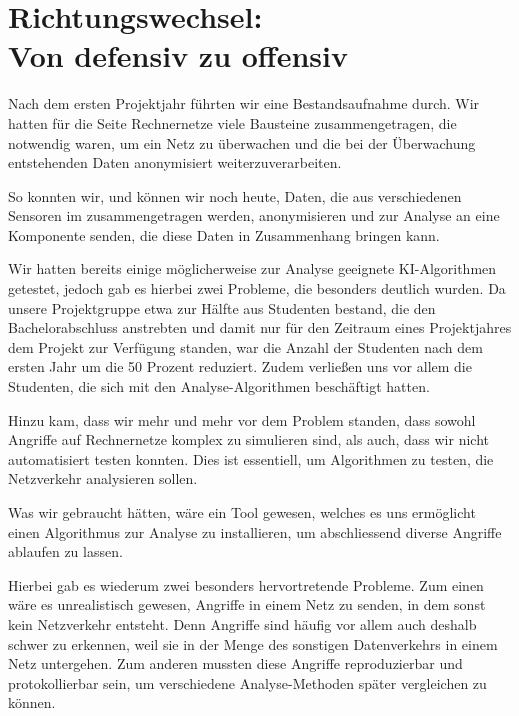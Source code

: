 
\section[Richtungswechsel: Von defensiv zu offensiv]
  {Richtungswechsel:\\Von defensiv zu offensiv}
\label{sec:motivation:change}

\authors{\DE \and \JF}{\LM \and \KUH \and \MW \and \BK}

Nach dem ersten Projektjahr führten wir eine Bestandsaufnahme
durch. Wir hatten für die Seite Rechnernetze viele Bausteine
zusammengetragen, die notwendig waren, um ein Netz zu überwachen und
die bei der Überwachung entstehenden Daten anonymisiert
weiterzuverarbeiten.

So konnten wir, und können wir noch heute, Daten, die aus
verschiedenen Sensoren im  zusammengetragen werden,
anonymisieren und zur Analyse an eine Komponente senden, die diese
Daten in Zusammenhang bringen kann.

Wir hatten bereits einige möglicherweise zur Analyse geeignete
KI-Algorithmen getestet, jedoch gab es hierbei zwei Probleme, die
besonders deutlich wurden. Da unsere Projektgruppe etwa zur Hälfte aus
Studenten bestand, die den Bachelorabschluss anstrebten und damit nur
für den Zeitraum eines Projektjahres dem Projekt zur Verfügung
standen, war die Anzahl der Studenten nach dem ersten Jahr um die 50
Prozent reduziert. Zudem verließen uns vor allem die Studenten, die
sich mit den Analyse-Algorithmen beschäftigt hatten.

Hinzu kam, dass wir mehr und mehr vor dem Problem standen, dass sowohl
Angriffe auf Rechnernetze komplex zu simulieren sind, als auch, dass
wir nicht automatisiert testen konnten. Dies ist essentiell, um
Algorithmen zu testen, die Netzverkehr analysieren sollen.

Was wir gebraucht hätten, wäre ein Tool gewesen, welches es uns
ermöglicht einen Algorithmus zur Analyse zu installieren, um
abschliessend diverse Angriffe ablaufen zu lassen.

Hierbei gab es wiederum zwei besonders hervortretende Probleme. Zum
einen wäre es unrealistisch gewesen, Angriffe in einem Netz zu senden,
in dem sonst kein Netzverkehr entsteht. Denn Angriffe sind häufig vor
allem auch deshalb schwer zu erkennen, weil sie in der Menge des
sonstigen Datenverkehrs in einem Netz untergehen. Zum anderen mussten
diese Angriffe reproduzierbar und protokollierbar sein, um
verschiedene Analyse-Methoden später vergleichen zu können.

